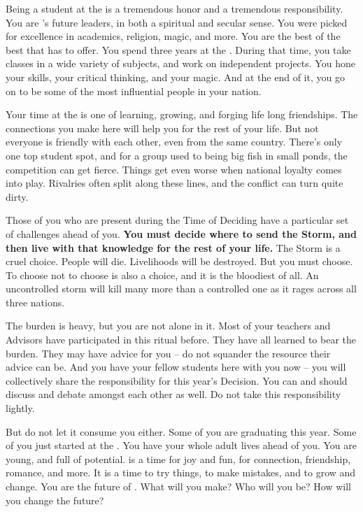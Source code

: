 \documentclass[blue]{GL2020}
\begin{document}
\name{\bStudentBlue{}}

Being a student at the \pSchool{} is a tremendous honor and a tremendous responsibility. You are \pEarth{}'s future leaders, in both a spiritual and secular sense. You were picked for excellence in academics, religion, magic, and more. You are the best of the best that \pEarth{} has to offer. You spend three years at the \pSchool{}. During that time, you take classes in a wide variety of subjects, and work on independent projects. You hone your skills, your critical thinking, and your magic. And at the end of it, you go on to be some of the most influential people in your nation.

Your time at the \pSc{} is one of learning, growing, and forging life long friendships. The connections you make here will help you for the rest of your life. But not everyone is friendly with each other, even from the same country. There's only one top student spot, and for a group used to being big fish in small ponds, the competition can get fierce. Things get even worse when national loyalty comes into play. Rivalries often split along these lines, and the conflict can turn quite dirty.

Those of you who are present during the Time of Deciding have a particular set of challenges ahead of you. \textbf{You must decide where to send the Storm, and then live with that knowledge for the rest of your life.} The Storm is a cruel choice. People will die. Livelihoods will be destroyed. But you must choose. To choose not to choose is also a choice, and it is the bloodiest of all. An uncontrolled storm will kill many more than a controlled one as it rages across all three nations.

The burden is heavy, but you are not alone in it. Most of your teachers and Advisors have participated in this ritual before. They have all learned to bear the burden. They may have advice for you -- do not squander the resource their advice can be. And you have your fellow students here with you now -- you will collectively share the responsibility for this year's Decision. You can and should discuss and debate amongst each other as well. Do not take this responsibility lightly.

But do not let it consume you either. Some of you are graduating this year. Some of you just started at the \pSchool{}. You have your whole adult lives ahead of you. You are young, and full of potential. \pSc{} is a time for joy and fun, for connection, friendship, romance, and more. It is a time to try things, to make mistakes, and to grow and change. You are the future of \pEarth{}. What will you make? Who will you be? How will you change the future?
\end{document}
